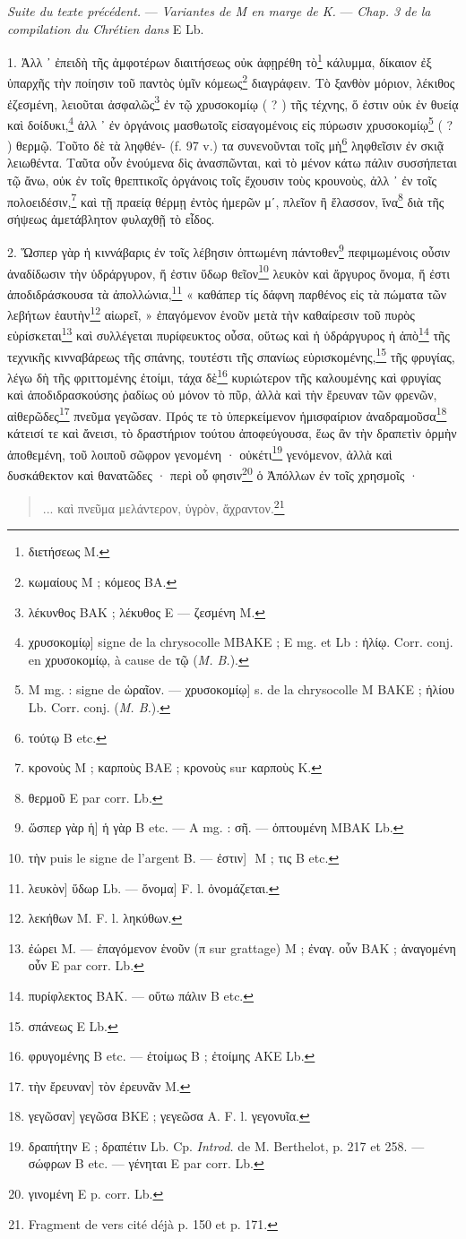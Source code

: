 \documentclass[a4paper, 11pt, oneside, polutonikogreek, french]{article}
\newcommand*\svgE{}
\begin{document}
\emph{Suite du texte précédent.} --- \emph{Variantes de M en marge de K.} --- \emph{Chap. 3 de la compilation du Chrétien dans} E Lb.

\bigskip

1. Ἀλλ ᾽ ἐπειδὴ τῆς ἀμφοτέρων διαιτήσεως οὐκ ἀφῃρέθη τὸ\footnote{διετήσεως M.} κάλυμμα, δίκαιον ἐξ ὑπαρχῆς τὴν ποίησιν τοῦ παντὸς ὑμῖν κόμεως\footnote{κωμαίους M ; κόμεος BA.} διαγράφειν. Τὸ ξανθὸν μόριον, λέκιθος ἐζεσμένη, λειοῦται ἀσφαλῶς\footnote{λέκυνθος BAK ; λέκυθος E --- ζεσμένη M.} ἐν τῷ χρυσοκομίῳ ( ? ) τῆς τέχνης, ὅ ἐστιν οὐκ ἐν θυείᾳ καὶ δοίδυκι,\footnote{χρυσοκομίῳ] signe de la chrysocolle MBAKE ; E mg. et Lb : ἡλίῳ. Corr. conj. en χρυσοκομίῳ, à cause de τῷ (\emph{M. B.}).} ἀλλ ᾽ ἐν ὀργάνοις μασθωτοῖς εἰσαγομένοις εἰς πύρωσιν χρυσοκομίῳ\footnote{M mg. : signe de ὡραῖον. --- χρυσοκομίῳ] s. de la chrysocolle M BAKE ; ἡλίου Lb. Corr. conj. (\emph{M. B.}).} ( ? ) θερμῷ. Τοῦτο δὲ τὰ ληφθέν- (f. 97 v.) τα συνενοῦνται τοῖς μὴ\footnote{τούτῳ B etc.} ληφθεῖσιν ἐν σκιᾷ λειωθέντα. Ταῦτα οὖν ἑνούμενα δὶς ἀνασπῶνται, καὶ τὸ μένον κάτω πάλιν συσσήπεται τῷ ἄνω, οὐκ ἐν τοῖς θρεπτικοῖς ὀργάνοις τοῖς ἔχουσιν τοὺς κρουνοὺς, ἀλλ ᾽ ἐν τοῖς πολοειδέσιν,\footnote{κρονοὺς M ; καρποὺς BAE ; κρονοὺς sur καρποὺς K.} καὶ τῇ πραείᾳ θέρμῃ ἐντὸς ἡμερῶν μʹ, πλεῖον ἢ ἔλασσον, ἵνα\footnote{θερμοῦ E par corr. Lb.} διὰ τῆς σήψεως ἀμετάβλητον φυλαχθῇ τὸ εἶδος.

2. Ὥσπερ γὰρ ἡ κιννάβαρις ἐν τοῖς λέβησιν ὀπτωμένη πάντοθεν\footnote{ὥσπερ γὰρ ἡ] ἡ γὰρ B etc. --- A mg. : σῆ. --- ὀπτουμένη MBAK Lb.} πεφιμωμένοις οὖσιν ἀναδίδωσιν τὴν ὑδράργυρον, ἥ ἐστιν ὕδωρ θεῖον\footnote{τὴν puis le signe de l'argent B. --- ἐστιν] $\svgE$ M ; τις B etc.} λευκὸν καὶ ἄργυρος ὄνομα, ἥ ἐστι ἀποδιδράσκουσα τὰ ἀπολλώνια,\footnote{λευκὸν] ὕδωρ Lb. --- ὄνομα] F. l. ὀνομάζεται.} « καθάπερ τίς δάφνη παρθένος εἰς τὰ πώματα τῶν λεβήτων ἑαυτὴν\footnote{λεκήθων M. F. l. ληκύθων.} αἰωρεῖ, » ἐπαγόμενον ἑνοῦν μετὰ τὴν καθαίρεσιν τοῦ πυρὸς εὑρίσκεται\footnote{ἐώρει M. --- ἐπαγόμενον ἑνοῦν (π sur grattage) M ; ἐναγ. οὗν BAK ; ἀναγομένη οὖν E par corr. Lb.} καὶ συλλέγεται πυρίφευκτος οὖσα, οὕτως καὶ ἡ ὑδράργυρος ἡ ἀπὸ\footnote{πυρίφλεκτος BAK. --- οὕτω πάλιν B etc.} τῆς τεχνικῆς κινναβάρεως τῆς σπάνης, τουτέστι τῆς σπανίως εὑρισκομένης,\footnote{σπάνεως E Lb.} τῆς φρυγίας, λέγω δὴ τῆς φριττομένης ἐτοίμι, τάχα δὲ\footnote{φρυγομένης B etc. --- ἐτοίμως B ; ἐτοίμης AKE Lb.} κυριώτερον τῆς καλουμένης καὶ φρυγίας καὶ ἀποδιδρασκούσης ῥαδίως οὐ μόνον τὸ πῦρ, ἀλλὰ καὶ τὴν ἔρευναν τῶν φρενῶν, αἰθερῶδες\footnote{τὴν ἔρευναν] τὸν ἐρευνᾶν M.} πνεῦμα γεγῶσαν. Πρός τε τὸ ὑπερκείμενον ἡμισφαίριον ἀναδραμοῦσα\footnote{γεγῶσαν] γεγῶσα BKE ; γεγεῶσα A. F. l. γεγονυῖα.} κάτεισί τε καὶ ἄνεισι, τὸ δραστήριον τούτου ἀποφεύγουσα, ἕως ἂν τὴν δραπετὶν ὁρμὴν ἀποθεμένη, τοῦ λοιποῦ σῶφρον γενομένη · οὐκέτι\footnote{δραπήτην E ; δραπέτιν Lb. Cp. \emph{Introd.} de M. Berthelot, p. 217 et 258. --- σώφρων B etc. --- γένηται E par corr. Lb.} γενόμενον, ἀλλὰ καὶ δυσκάθεκτον καὶ θανατῶδες · περὶ οὗ φησιν\footnote{γινομένη E p. corr. Lb.} ὁ Ἀπόλλων ἐν τοῖς χρησμοῖς ·
\begin{quotation}
\small
... καὶ πνεῦμα μελάντερον, ὑγρὸν, ἄχραντον.\footnote{Fragment de vers cité déjà p. 150 et p. 171.}
\end{quotation}
\end{document}
